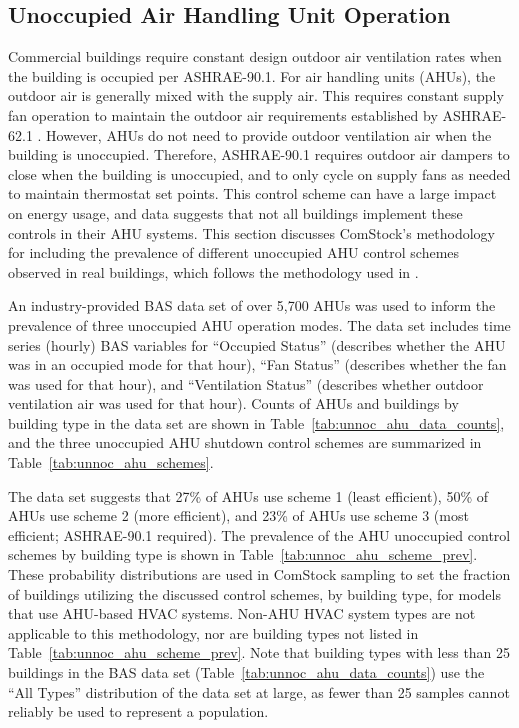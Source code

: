 
\pagebreak
\subsection{Unoccupied Air Handling Unit Operation}
\label{sec:unoccupied_ahu_operation}

Commercial buildings require constant design outdoor air ventilation rates when the building is occupied per ASHRAE-90.1. For air handling units (AHUs), the outdoor air is generally mixed with the supply air. This requires constant supply fan operation to maintain the outdoor air requirements established by ASHRAE-62.1 \citep{ashrae_62.1_2004}. However, AHUs do not need to provide outdoor ventilation air when the building is unoccupied. Therefore, ASHRAE-90.1 requires outdoor air dampers to close when the building is unoccupied, and to only cycle on supply fans as needed to maintain thermostat set points. This control scheme can have a large impact on energy usage, and data suggests that not all buildings implement these controls in their AHU systems. This section discusses ComStock's methodology for including the prevalence of different unoccupied AHU control schemes observed in real buildings, which follows the methodology used in \cite{unocc_hvac_paper}.

An industry-provided BAS data set of over 5,700 AHUs was used to inform the prevalence of three unoccupied AHU operation modes. The data set includes time series (hourly) BAS variables for ``Occupied Status'' (describes whether the AHU was in an occupied mode for that hour), ``Fan Status'' (describes whether the fan was used for that hour), and ``Ventilation Status'' (describes whether outdoor ventilation air was used for that hour). Counts of AHUs and buildings by building type in the data set are shown in Table~\ref{tab:unnoc_ahu_data_counts}, and the three unoccupied AHU shutdown control schemes are summarized in Table~\ref{tab:unnoc_ahu_schemes}.

The data set suggests that 27\% of AHUs use scheme 1 (least efficient), 50\% of AHUs use scheme 2 (more efficient), and 23\% of AHUs use scheme 3 (most efficient; ASHRAE-90.1 required). The prevalence of the AHU unoccupied control schemes by building type is shown in Table~\ref{tab:unnoc_ahu_scheme_prev}. These probability distributions are used in ComStock sampling to set the fraction of buildings utilizing the discussed control schemes, by building type, for models that use AHU-based HVAC systems. Non-AHU HVAC system types are not applicable to this methodology, nor are building types not listed in Table~\ref{tab:unnoc_ahu_scheme_prev}. Note that building types with less than 25 buildings in the BAS data set (Table~\ref{tab:unnoc_ahu_data_counts}) use the ``All Types'' distribution of the data set at large, as fewer than 25 samples cannot reliably be used to represent a population.

